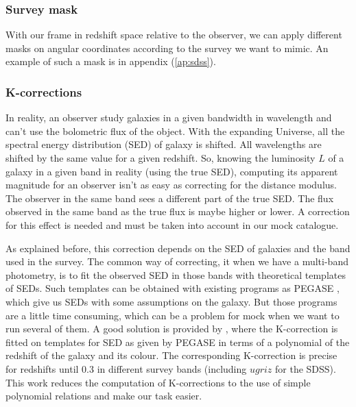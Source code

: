 \subsubsection{Survey mask}
%
With our frame in redshift space relative to the observer, we can apply
different masks on angular coordinates according to the survey we want to
mimic. An example of such a mask is in appendix (\ref{ap:sdss}).
%
\subsubsection{K-corrections}
%
In reality, an observer study galaxies in a given bandwidth in wavelength and
can't use the bolometric flux of the object. With the expanding Universe, all
the spectral energy distribution (SED) of galaxy is shifted. All wavelengths
are shifted by the same value for a given redshift. So, knowing the luminosity
$L$ of a galaxy in a given band in reality (using the true SED), computing its
apparent magnitude for an observer isn't as easy as correcting for the distance
modulus. The observer in the same band sees a different part of the true SED\@.
The flux observed in the same band as the true flux is maybe higher or lower. A
correction for this effect is needed and must be taken into account in our mock
catalogue.

As explained before, this correction depends on the SED of galaxies and the
band used in the survey. The common way of correcting, it when we have a
multi-band photometry, is to fit the observed SED in those bands with
theoretical templates of SEDs. Such templates can be obtained with existing
programs as PEGASE , which give us SEDs with some
assumptions on the galaxy. But those programs are a little time consuming,
which can be a problem for mock when we want to run several of them. A good
solution is provided by \citet{Chilingarian+10}, where the K-correction is
fitted on templates for SED as given by PEGASE in terms of a polynomial of the
redshift of the galaxy and its colour. The corresponding K-correction is
precise for redshifts until 0.3 in different survey bands (including $ugriz$
for the SDSS). This work reduces the computation of K-corrections to the use of
simple polynomial relations and make our task easier.

